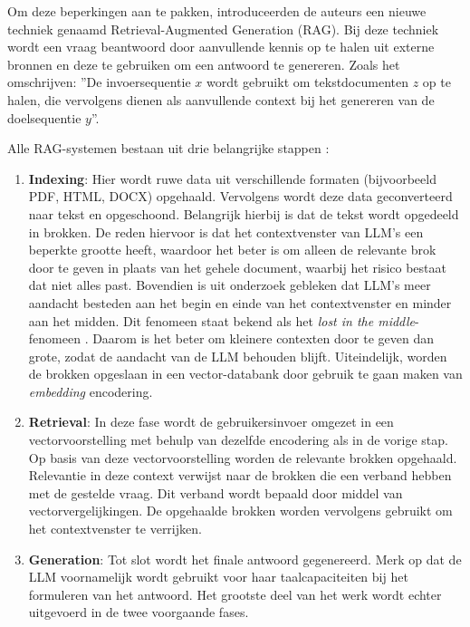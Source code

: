 Om deze beperkingen aan te pakken, introduceerden de auteurs een nieuwe techniek genaamd Retrieval-Augmented Generation (RAG). Bij deze techniek wordt een vraag beantwoord door aanvullende kennis op te halen uit externe bronnen en deze te gebruiken om een antwoord te genereren. Zoals \textcite{Lewis2020} het omschrijven: ''De invoersequentie $x$ wordt gebruikt om tekstdocumenten $z$ op te halen, die vervolgens dienen als aanvullende context bij het genereren van de doelsequentie $y$''.

Alle RAG-systemen bestaan uit drie belangrijke stappen \autocite{Gao2023}:  

\begin{enumerate} 
    \item \textbf{Indexing}: Hier wordt ruwe data uit verschillende formaten (bijvoorbeeld PDF, HTML, DOCX) opgehaald. Vervolgens wordt deze data geconverteerd naar tekst en opgeschoond. Belangrijk hierbij is dat de tekst wordt opgedeeld in brokken. De reden hiervoor is dat het contextvenster van LLM's een beperkte grootte heeft, waardoor het beter is om alleen de relevante brok door te geven in plaats van het gehele document, waarbij het risico bestaat dat niet alles past. Bovendien is uit onderzoek gebleken dat LLM's meer aandacht besteden aan het begin en einde van het contextvenster en minder aan het midden. Dit fenomeen staat bekend als het \emph{lost in the middle}-fenomeen \autocite{Databricks}. Daarom is het beter om kleinere contexten door te geven dan grote, zodat de aandacht van de LLM behouden blijft. Uiteindelijk, worden de brokken opgeslaan in een vector-databank door gebruik te gaan maken van \emph{embedding} encodering.
    \item \textbf{Retrieval}: In deze fase wordt de gebruikersinvoer omgezet in een vectorvoorstelling met behulp van dezelfde encodering als in de vorige stap. Op basis van deze vectorvoorstelling worden de relevante brokken opgehaald. Relevantie in deze context verwijst naar de brokken die een verband hebben met de gestelde vraag. Dit verband wordt bepaald door middel van vectorvergelijkingen. De opgehaalde brokken worden vervolgens gebruikt om het contextvenster te verrijken.
    \item \textbf{Generation}: Tot slot wordt het finale antwoord gegenereerd. Merk op dat de LLM voornamelijk wordt gebruikt voor haar taalcapaciteiten bij het formuleren van het antwoord. Het grootste deel van het werk wordt echter uitgevoerd in de twee voorgaande fases.
\end{enumerate}

